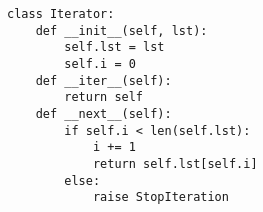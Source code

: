 \begin{lstlisting}
class Iterator:
    def __init__(self, lst):
        self.lst = lst
        self.i = 0
    def __iter__(self):
        return self
    def __next__(self):
        if self.i < len(self.lst):
            i += 1
            return self.lst[self.i]
        else:
            raise StopIteration
\end{lstlisting}
